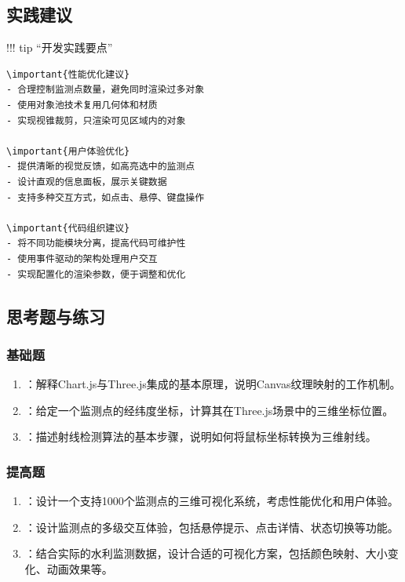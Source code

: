 \hypertarget{ux5b9eux8df5ux5efaux8bae}{%
\subsection{实践建议}\label{ux5b9eux8df5ux5efaux8bae}}

!!! tip ``开发实践要点''

\begin{verbatim}
\important{性能优化建议}
- 合理控制监测点数量，避免同时渲染过多对象
- 使用对象池技术复用几何体和材质
- 实现视锥裁剪，只渲染可见区域内的对象

\important{用户体验优化}
- 提供清晰的视觉反馈，如高亮选中的监测点
- 设计直观的信息面板，展示关键数据
- 支持多种交互方式，如点击、悬停、键盘操作

\important{代码组织建议}
- 将不同功能模块分离，提高代码可维护性
- 使用事件驱动的架构处理用户交互
- 实现配置化的渲染参数，便于调整和优化
\end{verbatim}

\hypertarget{ux601dux8003ux9898ux4e0eux7ec3ux4e60}{%
\subsection{思考题与练习}\label{ux601dux8003ux9898ux4e0eux7ec3ux4e60}}

\hypertarget{ux57faux7840ux9898}{%
\subsubsection{基础题}\label{ux57faux7840ux9898}}

\begin{enumerate}
\def\labelenumi{\arabic{enumi}.}
\item
  ：解释Chart.js与Three.js集成的基本原理，说明Canvas纹理映射的工作机制。
\item
  ：给定一个监测点的经纬度坐标，计算其在Three.js场景中的三维坐标位置。
\item
  ：描述射线检测算法的基本步骤，说明如何将鼠标坐标转换为三维射线。
\end{enumerate}

\hypertarget{ux63d0ux9ad8ux9898}{%
\subsubsection{提高题}\label{ux63d0ux9ad8ux9898}}

\begin{enumerate}
\def\labelenumi{\arabic{enumi}.}
\item
  ：设计一个支持1000个监测点的三维可视化系统，考虑性能优化和用户体验。
\item
  ：设计监测点的多级交互体验，包括悬停提示、点击详情、状态切换等功能。
\item
  ：结合实际的水利监测数据，设计合适的可视化方案，包括颜色映射、大小变化、动画效果等。
\end{enumerate}

